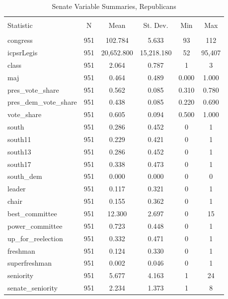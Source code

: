\documentclass[12pt]{article}
\begin{document}
\begin{table}[H] \centering 
	\caption{Senate Variable Summaries, Republicans} 
	\label{} 
	\begin{tabular}{@{\extracolsep{5pt}}lccccc} 
		\\[-1.8ex]\hline 
		\hline \\[-1.8ex] 
		Statistic & \multicolumn{1}{c}{N} & \multicolumn{1}{c}{Mean} & \multicolumn{1}{c}{St. Dev.} & \multicolumn{1}{c}{Min} & \multicolumn{1}{c}{Max} \\ 
		\hline \\[-1.8ex] 
		congress & 951 & 102.784 & 5.633 & 93 & 112 \\ 
		icpsrLegis & 951 & 20,652.800 & 15,218.180 & 52 & 95,407 \\ 
		class & 951 & 2.064 & 0.787 & 1 & 3 \\ 
		maj & 951 & 0.464 & 0.489 & 0.000 & 1.000 \\ 
		pres\_vote\_share & 951 & 0.562 & 0.085 & 0.310 & 0.780 \\ 
		pres\_dem\_vote\_share & 951 & 0.438 & 0.085 & 0.220 & 0.690 \\ 
		vote\_share & 951 & 0.605 & 0.094 & 0.500 & 1.000 \\ 
		south & 951 & 0.286 & 0.452 & 0 & 1 \\ 
		south11 & 951 & 0.229 & 0.421 & 0 & 1 \\ 
		south13 & 951 & 0.286 & 0.452 & 0 & 1 \\ 
		south17 & 951 & 0.338 & 0.473 & 0 & 1 \\ 
		south\_dem & 951 & 0.000 & 0.000 & 0 & 0 \\ 
		leader & 951 & 0.117 & 0.321 & 0 & 1 \\ 
		chair & 951 & 0.155 & 0.362 & 0 & 1 \\ 
		best\_committee & 951 & 12.300 & 2.697 & 0 & 15 \\ 
		power\_committee & 951 & 0.723 & 0.448 & 0 & 1 \\ 
		up\_for\_reelection & 951 & 0.332 & 0.471 & 0 & 1 \\ 
		freshman & 951 & 0.124 & 0.330 & 0 & 1 \\ 
		superfreshman & 951 & 0.002 & 0.046 & 0 & 1 \\ 
		seniority & 951 & 5.677 & 4.163 & 1 & 24 \\ 
		senate\_seniority & 951 & 2.234 & 1.373 & 1 & 8 \\ 

\end{tabular}
\end{table}
\end{document}
